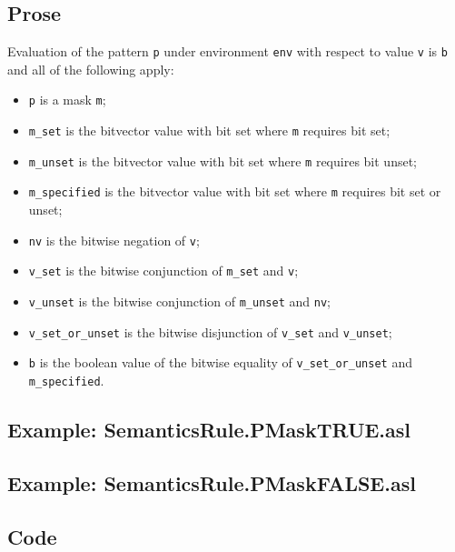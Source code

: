 \documentclass{book}
\begin{document}
    \subsection{Prose}
    Evaluation of the pattern \texttt{p} under environment \texttt{env} with
    respect to value \texttt{v} is \texttt{b} and all of the following apply:
    \begin{itemize}
      \item \texttt{p} is a mask \texttt{m};
      \item \texttt{m\_set} is the bitvector value with bit set where \texttt{m}
        requires bit set;
      \item \texttt{m\_unset} is the bitvector value with bit set where
        \texttt{m} requires bit unset;
      \item \texttt{m\_specified} is the bitvector value with bit set where
        \texttt{m} requires bit set or unset;
      \item \texttt{nv} is the bitwise negation of \texttt{v};
      \item \texttt{v\_set} is the bitwise conjunction of \texttt{m\_set} and
        \texttt{v};
      \item \texttt{v\_unset} is the bitwise conjunction of \texttt{m\_unset} and
        \texttt{nv};
      \item \texttt{v\_set\_or\_unset} is the bitwise disjunction of
        \texttt{v\_set} and \texttt{v\_unset};
      \item \texttt{b} is the boolean value of the bitwise equality of
        \texttt{v\_set\_or\_unset} and \texttt{m\_specified}.
    \end{itemize}

    \subsection{Example: SemanticsRule.PMaskTRUE.asl}

    \subsection{Example: SemanticsRule.PMaskFALSE.asl}

  \subsection{Code}
\end{document}
